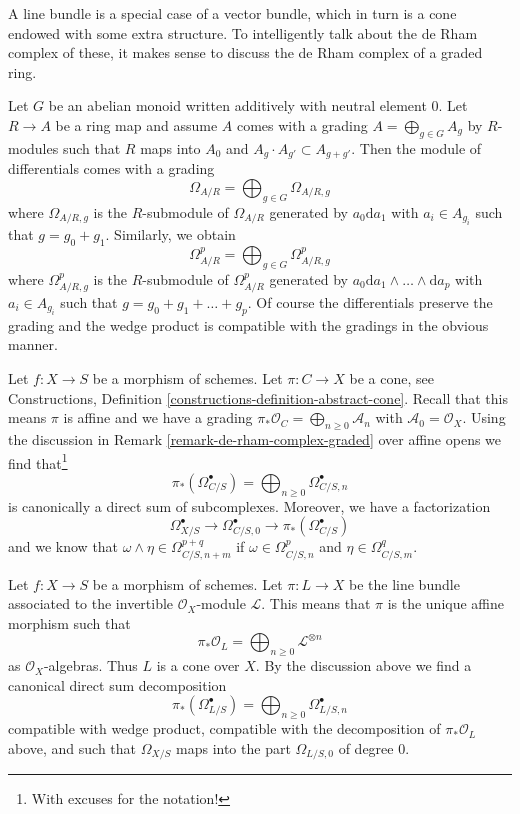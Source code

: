 \noindent
A line bundle is a special case of a vector bundle, which in turn is a
cone endowed with some extra structure. To intelligently talk about
the de Rham complex of these, it makes sense to discuss the de Rham
complex of a graded ring.

\begin{remark}
\label{remark-de-rham-complex-graded}
Let $G$ be an abelian monoid written additively with neutral element $0$.
Let $R \to A$ be a ring map and assume $A$ comes with a grading
$A = \bigoplus_{g \in G} A_g$ by $R$-modules such that $R$ maps into $A_0$
and $A_g \cdot A_{g'} \subset A_{g + g'}$. Then the module of differentials
comes with a grading
$$
\Omega_{A/R} = \bigoplus\nolimits_{g \in G} \Omega_{A/R, g}
$$
where $\Omega_{A/R, g}$ is the $R$-submodule of $\Omega_{A/R}$
generated by $a_0 \text{d}a_1$ with $a_i \in A_{g_i}$ such that
$g = g_0 + g_1$. Similarly, we obtain
$$
\Omega^p_{A/R} = \bigoplus\nolimits_{g \in G} \Omega^p_{A/R, g}
$$
where $\Omega^p_{A/R, g}$ is the $R$-submodule of $\Omega^p_{A/R}$
generated by $a_0 \text{d}a_1 \wedge \ldots \wedge \text{d}a_p$
with $a_i \in A_{g_i}$ such that $g = g_0 + g_1 + \ldots + g_p$.
Of course the differentials preserve the grading and the wedge
product is compatible with the gradings in the obvious manner.
\end{remark}

\noindent
Let $f : X \to S$ be a morphism of schemes. Let $\pi : C \to X$ be a cone, see
Constructions, Definition \ref{constructions-definition-abstract-cone}.
Recall that this means $\pi$ is affine and we have a grading
$\pi_*\mathcal{O}_C = \bigoplus_{n \geq 0} \mathcal{A}_n$ with
$\mathcal{A}_0 = \mathcal{O}_X$.
Using the discussion in Remark \ref{remark-de-rham-complex-graded}
over affine opens we find that\footnote{With excuses for the notation!}
$$
\pi_*(\Omega^\bullet_{C/S}) =
\bigoplus\nolimits_{n \geq 0} \Omega^\bullet_{C/S, n}
$$
is canonically a direct sum of subcomplexes. Moreover, we have a factorization
$$
\Omega^\bullet_{X/S} \to \Omega^\bullet_{C/S, 0} \to
\pi_*(\Omega^\bullet_{C/S})
$$
and we know that $\omega \wedge \eta \in \Omega^{p + q}_{C/S, n + m}$
if $\omega \in \Omega^p_{C/S, n}$ and $\eta \in \Omega^q_{C/S, m}$.

\medskip\noindent
Let $f : X \to S$ be a morphism of schemes. Let $\pi : L \to X$ be the
line bundle associated to the invertible $\mathcal{O}_X$-module $\mathcal{L}$.
This means that $\pi$ is the unique affine morphism such that
$$
\pi_*\mathcal{O}_L = 
\bigoplus\nolimits_{n \geq 0} \mathcal{L}^{\otimes n}
$$
as $\mathcal{O}_X$-algebras. Thus $L$ is a cone over $X$.
By the discussion above we find a
canonical direct sum decomposition
$$
\pi_*(\Omega^\bullet_{L/S}) =
\bigoplus\nolimits_{n \geq 0} \Omega^\bullet_{L/S, n}
$$
compatible with wedge product, compatible with the decomposition
of $\pi_*\mathcal{O}_L$ above, and such that $\Omega_{X/S}$
maps into the part $\Omega_{L/S, 0}$ of degree $0$.

